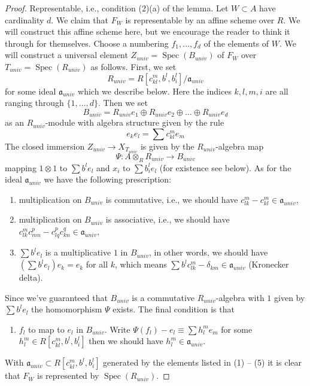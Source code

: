 \documentclass{stacks-project}
\theoremstyle{plain}
\theoremstyle{definition}
\theoremstyle{remark}
\numberwithin{equation}{subsection}
\def\Spec{\mathop{\mathrm{Spec}}}
\begin{document}
\begin{proof}
\medskip\noindent
Representable, i.e., condition (2)(a) of the lemma. Let $W \subset A$
have cardinality $d$. We claim that $F_W$ is representable by an affine
scheme over $R$. We will construct this affine scheme here, but we encourage
the reader to think it through for themselves. Choose a numbering
$f_1, \ldots, f_d$ of the elements of $W$. We will construct a universal
element $Z_{univ} = \Spec(B_{univ})$ of $F_W$ over $T_{univ} = \Spec(R_{univ})$
as follows. First, we set
$$
R_{univ} = R[c_{kl}^m, b^l, b_i^l]/\mathfrak a_{univ}
$$
for some ideal $\mathfrak a_{univ}$ which we describe below.
Here the indices $k, l, m, i$ are all ranging through $\{1, \ldots, d\}$.
Then we set
$$
B_{univ} = R_{univ}e_1 \oplus R_{univ}e_2 \oplus \ldots \oplus R_{univ}e_d
$$
as an $R_{univ}$-module with algebra structure given by the rule
$$
e_ke_l = \sum c_{kl}^m e_m
$$
The closed immersion $Z_{univ} \to X_{T_{univ}}$ is given
by the $R_{univ}$-algebra map
$$
\Psi : A \otimes_R R_{univ} \longrightarrow B_{univ}
$$
mapping $1 \otimes 1$ to $\sum b^le_l$ and $x_i$ to $\sum b_i^le_l$
(for existence see below). As for the ideal $\mathfrak a_{univ}$
we have the following prescription:
\begin{enumerate}
\item multiplication on $B_{univ}$ is commutative, i.e.,
we should have $c_{lk}^m - c_{kl}^m \in \mathfrak a_{univ}$,
\item multiplication on $B_{univ}$ is associative, i.e.,
we should have $c_{lk}^m c_{m n}^p - c_{lq}^p c_{kn}^q \in \mathfrak a_{univ}$,
\item $\sum b^le_l$ is a multiplicative $1$ in $B_{univ}$,
in other words, we should have $(\sum b^le_l)e_k = e_k$ for all $k$,
which means $\sum b^lc_{lk}^m - \delta_{km} \in \mathfrak a_{univ}$
(Kronecker delta).
\end{enumerate}
Since we've guaranteed that $B_{univ}$ is a commutative
$R_{univ}$-algebra with $1$ given by $\sum b^le_l$ the homomorphism $\Psi$
exists. The final condition is that
\begin{enumerate}
\item[(5)] $f_l$ to map to $e_l$ in $B_{univ}$. Write
$\Psi(f_l) - e_l \equiv \sum h_l^me_m$ for some
$h_l^m \in R[c_{kl}^m, b^l, b_i^l]$
then we should have $h_l^m \in \mathfrak a_{univ}$.
\end{enumerate}
With $\mathfrak a_{univ} \subset R[c_{kl}^m, b^l, b_i^l]$ generated
by the elements listed in (1) -- (5)
it is clear that $F_W$ is represented by $\Spec(R_{univ})$.
\end{proof}
\end{document}
